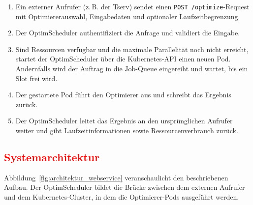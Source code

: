 \documentclass[
    12pt,               
    a4paper,            
    ngerman,            
    parskip=half,       
    headings=normal,   
    numbers=enddot,     
    toc=chapterentrywithdots 
]{scrreprt}\usepackage[utf8]{inputenc}
\begin{document}
\begin{enumerate}
    \item Ein externer Aufrufer (z.\,B. der Tserv) sendet einen \texttt{POST /optimize}-Request mit Optimiererauswahl, Eingabedaten und optionaler Laufzeitbegrenzung.
    \item Der OptimScheduler authentifiziert die Anfrage und validiert die Eingabe.
    \item Sind Ressourcen verfügbar und die maximale Parallelität noch nicht erreicht, startet der OptimScheduler über die Kubernetes-API einen neuen Pod. Andernfalls wird der Auftrag in die Job-Queue eingereiht und wartet, bis ein Slot frei wird.
    \item Der gestartete Pod führt den Optimierer aus und schreibt das Ergebnis zurück.
    \item Der OptimScheduler leitet das Ergebnis an den ursprünglichen Aufrufer weiter und gibt Laufzeitinformationen sowie Ressourcenverbrauch zurück.
\end{enumerate}

\subsection{\textcolor{red}{Systemarchitektur}}

Abbildung~\ref{fig:architektur_webservice} veranschaulicht den beschriebenen Aufbau. Der OptimScheduler bildet die Brücke zwischen dem externen Aufrufer und dem Kubernetes-Cluster, in dem die Optimierer-Pods ausgeführt werden.
\end{document}
